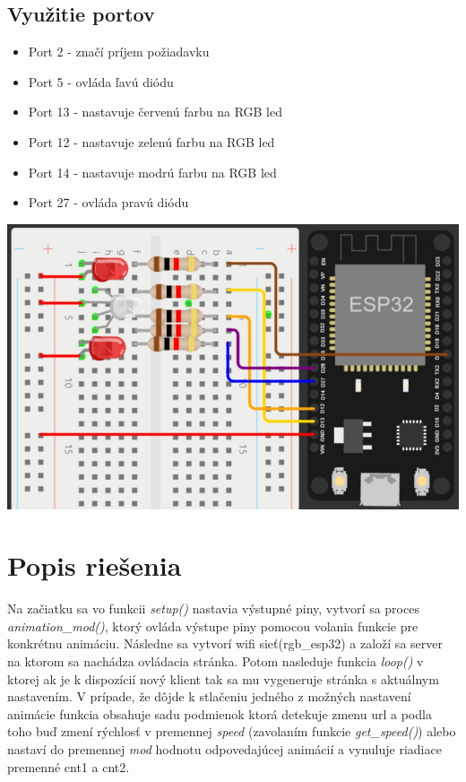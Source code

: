 \documentclass[a4paper, 11pt]{article}
\begin{document}
\subsection{Využitie portov}
\begin{itemize}
    \item Port 2 - značí príjem požiadavku
    \item Port 5 - ovláda ľavú diódu
    \item Port 13 - nastavuje červenú farbu na RGB led
    \item Port 12 - nastavuje zelenú farbu na RGB led
    \item Port 14 - nastavuje modrú farbu na RGB led
    \item Port 27 - ovláda pravú diódu
\end{itemize}
\includegraphics{img/zapojenie.jpg}

\section{Popis riešenia}
Na začiatku sa vo funkcii \textit{setup()} nastavia výstupné piny, vytvorí sa proces \textit{animation\_mod()}, ktorý ovláda výstupe piny pomocou volania funkcie pre konkrétnu animáciu. Následne sa vytvorí wifi sieť(rgb\_esp32) a založí sa server na ktorom sa nachádza ovládacia stránka. Potom nasleduje funkcia \textit{loop()} v ktorej ak je k dispozícií nový klient tak sa mu vygeneruje stránka s aktuálnym nastavením. V prípade, že dôjde k stlačeniu jedného z možných nastavení animácie funkcia obsahuje sadu podmienok ktorá detekuje zmenu url a podla toho buď zmení rýchlosť v premennej \textit{speed} (zavolaním funkcie \textit{get\_speed()}) alebo nastaví do premennej \textit{mod} hodnotu odpovedajúcej animácií a vynuluje riadiace premenné cnt1 a cnt2.
\end{document}
